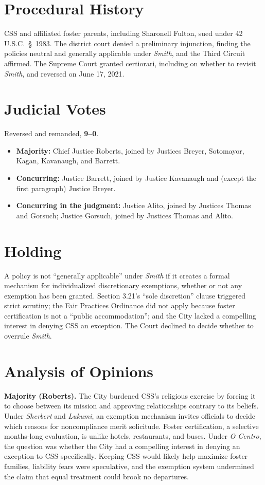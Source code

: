 \documentclass[12pt]{article}
\begin{document}
\section{Procedural History}

CSS and affiliated foster parents, including Sharonell Fulton, sued under 42 U.S.C.~\S~1983. The district court denied a preliminary injunction, finding the policies neutral and generally applicable under \textit{Smith}, and the Third Circuit affirmed. The Supreme Court granted certiorari, including on whether to revisit \textit{Smith}, and reversed on June 17, 2021.

\section{Judicial Votes}

Reversed and remanded, \textbf{9--0}.
\begin{itemize}
\item \textbf{Majority:} Chief Justice Roberts, joined by Justices Breyer, Sotomayor, Kagan, Kavanaugh, and Barrett.
\item \textbf{Concurring:} Justice Barrett, joined by Justice Kavanaugh and (except the first paragraph) Justice Breyer.
\item \textbf{Concurring in the judgment:} Justice Alito, joined by Justices Thomas and Gorsuch; Justice Gorsuch, joined by Justices Thomas and Alito.
\end{itemize}

\section{Holding}

A policy is not ``generally applicable'' under \textit{Smith} if it creates a formal mechanism for individualized discretionary exemptions, whether or not any exemption has been granted. Section 3.21's ``sole discretion'' clause triggered strict scrutiny; the Fair Practices Ordinance did not apply because foster certification is not a ``public accommodation''; and the City lacked a compelling interest in denying CSS an exception. The Court declined to decide whether to overrule \textit{Smith}.

\section{Analysis of Opinions}

\textbf{Majority (Roberts).} The City burdened CSS's religious exercise by forcing it to choose between its mission and approving relationships contrary to its beliefs. Under \textit{Sherbert} and \textit{Lukumi}, an exemption mechanism invites officials to decide which reasons for noncompliance merit solicitude. Foster certification, a selective months-long evaluation, is unlike hotels, restaurants, and buses. Under \textit{O Centro}, the question was whether the City had a compelling interest in denying an exception to CSS specifically. Keeping CSS would likely help maximize foster families, liability fears were speculative, and the exemption system undermined the claim that equal treatment could brook no departures.
\end{document}
